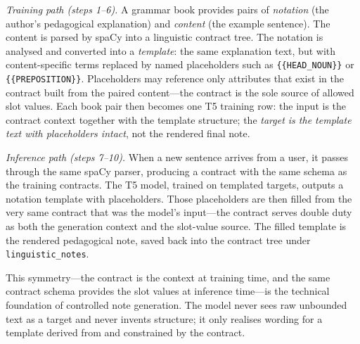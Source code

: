 \documentclass[12pt,a4paper,oneside]{report}
\begin{document}
\textit{Training path (steps 1--6).} A grammar book provides pairs of \emph{notation} (the author's pedagogical explanation) and \emph{content} (the example sentence). The content is parsed by spaCy into a linguistic contract tree. The notation is analysed and converted into a \emph{template}: the same explanation text, but with content-specific terms replaced by named placeholders such as \texttt{\{\{HEAD\_NOUN\}\}} or \texttt{\{\{PREPOSITION\}\}}. Placeholders may reference only attributes that exist in the contract built from the paired content---the contract is the sole source of allowed slot values. Each book pair then becomes one T5 training row: the input is the contract context together with the template structure; the \emph{target is the template text with placeholders intact}, not the rendered final note.

\textit{Inference path (steps 7--10).} When a new sentence arrives from a user, it passes through the same spaCy parser, producing a contract with the same schema as the training contracts. The T5 model, trained on templated targets, outputs a notation template with placeholders. Those placeholders are then filled from the very same contract that was the model's input---the contract serves double duty as both the generation context and the slot-value source. The filled template is the rendered pedagogical note, saved back into the contract tree under \texttt{linguistic\_notes}.

This symmetry---the contract is the context at training time, and the same contract schema provides the slot values at inference time---is the technical foundation of controlled note generation. The model never sees raw unbounded text as a target and never invents structure; it only realises wording for a template derived from and constrained by the contract.
\end{document}
